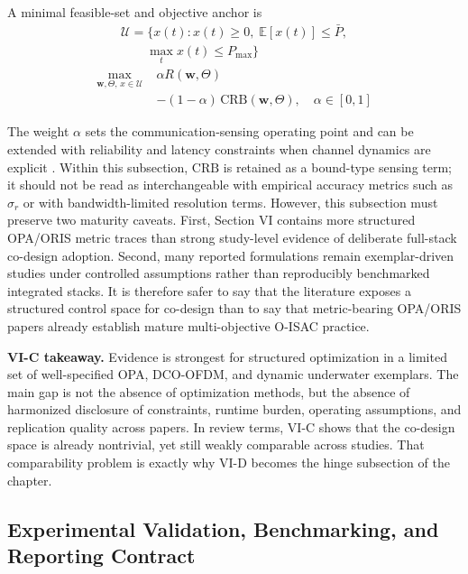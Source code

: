 \documentclass[lettersize,journal]{IEEEtran}
\begin{document}
A minimal feasible-set and objective anchor is
\begin{equation}
\begin{split}
\mathcal U=\{x(t):x(t)\ge 0,\;\mathbb{E}[x(t)]\le \bar P,\\
\qquad \max_t x(t)\le P_{\max}\}
\end{split}
\end{equation}
\begin{equation}
\begin{split}
\max_{\mathbf{w},\Theta,\,x\in\mathcal U}\;&\alpha R(\mathbf{w},\Theta)\\
&-(1-\alpha)\,\mathrm{CRB}(\mathbf{w},\Theta),\quad \alpha\in[0,1]
\end{split}
\end{equation}

The weight $\alpha$ sets the communication-sensing operating point and can be extended with reliability and latency constraints when channel dynamics are explicit \cite{O_ISAC_023,O_ISAC_061,O_ISAC_091,O_ISAC_127}. Within this subsection, $\mathrm{CRB}$ is retained as a bound-type sensing term; it should not be read as interchangeable with empirical accuracy metrics such as $\sigma_r$ or with bandwidth-limited resolution terms. However, this subsection must preserve two maturity caveats. First, Section VI contains more structured OPA/ORIS metric traces than strong study-level evidence of deliberate full-stack co-design adoption. Second, many reported formulations remain exemplar-driven studies under controlled assumptions rather than reproducibly benchmarked integrated stacks. It is therefore safer to say that the literature exposes a structured control space for co-design than to say that metric-bearing OPA/ORIS papers already establish mature multi-objective O-ISAC practice.

\textbf{VI-C takeaway.} Evidence is strongest for structured optimization in a limited set of well-specified OPA, DCO-OFDM, and dynamic underwater exemplars. The main gap is not the absence of optimization methods, but the absence of harmonized disclosure of constraints, runtime burden, operating assumptions, and replication quality across papers. In review terms, VI-C shows that the co-design space is already nontrivial, yet still weakly comparable across studies. That comparability problem is exactly why VI-D becomes the hinge subsection of the chapter.

\subsection{Experimental Validation, Benchmarking, and Reporting Contract}
\end{document}
